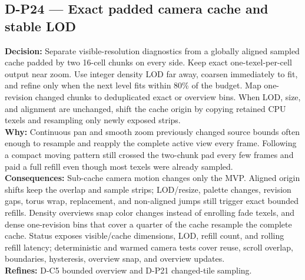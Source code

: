\subsection*{D-P24 --- Exact padded camera cache and stable LOD}
\begin{decisionbox}[title={D-P24 \quad 2026-08-09}]
\textbf{Decision:} Separate visible-resolution diagnostics from a globally
aligned sampled cache padded by two 16-cell chunks on every side. Keep exact
one-texel-per-cell output near zoom. Use integer density LOD far away, coarsen
immediately to fit, and refine only when the next level fits within 80\% of the
budget. Map one-revision changed chunks to deduplicated exact or overview bins.
When LOD, size, and alignment are unchanged, shift the cache origin by copying
retained CPU texels and resampling only newly exposed strips.\\
\textbf{Why:} Continuous pan and smooth zoom previously changed source bounds
often enough to resample and reapply the complete active view every frame.
Following a compact moving pattern still crossed the two-chunk pad every few
frames and paid a full refill even though most texels were already sampled.\\
\textbf{Consequences:} Sub-cache camera motion changes only the MVP. Aligned
origin shifts keep the overlap and sample strips; LOD/resize, palette changes,
revision gaps, torus wrap, replacement, and non-aligned jumps still trigger
exact bounded refills. Density overviews snap color changes instead of
enrolling fade texels, and dense one-revision bins that cover a quarter of the
cache resample the complete cache. Status exposes visible/cache dimensions,
LOD, refill count, and rolling refill latency; deterministic and warmed camera
tests cover reuse, scroll overlap, boundaries, hysteresis, overview snap, and
overview updates.\\
\textbf{Refines:} D-C5 bounded overview and D-P21 changed-tile sampling.
\end{decisionbox}

